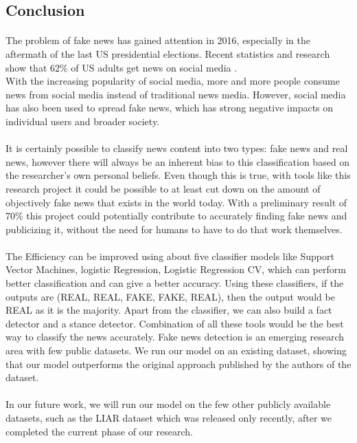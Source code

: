 \documentclass[11.5pt]{article}
\begin{document}
\begin{multicols}{2}
\section{Conclusion}
\paragraph{}
The problem of fake news has gained attention in 2016, especially in the aftermath of the last US presidential elections. Recent statistics and research show that $62\%$ of US adults get news on social media \cite{gottfried26}\cite{gottfried4}.\\
With the increasing popularity of social media, more and more people consume news from social media instead of traditional news media. However, social media has also been used to spread fake news, which has strong negative impacts on individual users and broader society.
\paragraph{}
It is certainly possible to classify news content into two types: fake news and real news, however there will always be an inherent bias to this classiﬁcation based on the researcher’s own personal beliefs. Even though this is true, with tools like this research project it could be possible to at least cut down on the amount of objectively fake news that exists in the world today. With a preliminary result of 70\% this project could potentially contribute to accurately ﬁnding fake news and publicizing it, without the need for humans to have to do that work themselves.
\paragraph{}
The Efficiency can be improved using about five classifier models like Support Vector Machines, logistic Regression, Logistic Regression CV, which can perform better classification and can give a better accuracy. Using these classifiers, if the outputs are (REAL, REAL, FAKE, FAKE, REAL), then the output would be REAL as it is the majority. Apart from the classifier, we can also build a fact detector and a stance detector. Combination of all these tools would be the best  way to classify the news accurately.
\newline
Fake news detection is an emerging research area with few public datasets. We run our model on an existing dataset, showing that our model outperforms the original approach published by the authors of the dataset. 
\paragraph{}
In our future work, we will run our model on the few other publicly available datasets, such as the LIAR dataset which was released only recently, after we completed the current phase of our research.




\end{multicols}
\end{document}
